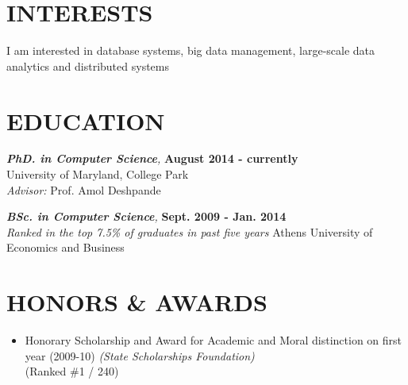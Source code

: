 \documentclass[margin, 10pt]{res} %
\begin{document}
\begin{resume}


\section{INTERESTS}

I am interested in database systems, big data management, large-scale data analytics and distributed systems


\section{EDUCATION}

{\sl \textbf{PhD. in Computer Science},}  \hfill \textbf{August 2014 - currently} \\
University of Maryland, College Park\\
\textit{Advisor:} Prof. Amol Deshpande

{\sl \textbf{BSc. in Computer Science},}  \hfill \textbf{Sept. 2009 - Jan. 2014} \\
\textit{Ranked in the top 7.5\% of graduates in past five years}
Athens University of Economics and Business\\


\section{HONORS \& AWARDS}

\begin{itemize}
  \item Honorary Scholarship and Award for Academic and Moral distinction on first year (2009-10)
 \textit{(State Scholarships Foundation)}\\
 (Ranked \#1 / 240)
\end{itemize}


\end{resume}
\end{document}
